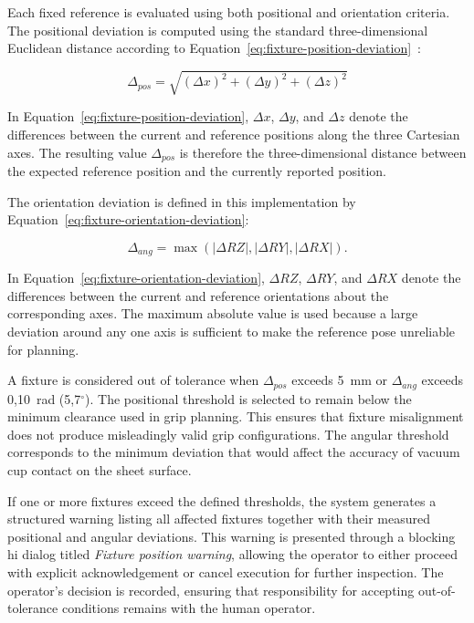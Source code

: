 Each fixed reference is evaluated using both positional and orientation criteria. The positional deviation is computed using the standard three-dimensional Euclidean distance according to Equation~\ref{eq:fixture-position-deviation}~\cite{OpenStaxCalculusVolume3}:

\begin{equation}
\Delta_{pos} = \sqrt{(\Delta x)^2 + (\Delta y)^2 + (\Delta z)^2}
\label{eq:fixture-position-deviation}
\end{equation}

In Equation~\ref{eq:fixture-position-deviation}, $\Delta x$, $\Delta y$, and $\Delta z$ denote the differences between the current and reference positions along the three Cartesian axes. The resulting value $\Delta_{pos}$ is therefore the three-dimensional distance between the expected reference position and the currently reported position.

The orientation deviation is defined in this implementation by Equation~\ref{eq:fixture-orientation-deviation}:

\begin{equation}
\Delta_{ang} = \max\left(|\Delta RZ|, |\Delta RY|, |\Delta RX|\right).
\label{eq:fixture-orientation-deviation}
\end{equation}

In Equation~\ref{eq:fixture-orientation-deviation}, $\Delta RZ$, $\Delta RY$, and $\Delta RX$ denote the differences between the current and reference orientations about the corresponding axes. The maximum absolute value is used because a large deviation around any one axis is sufficient to make the reference pose unreliable for planning.

A fixture is considered out of tolerance when $\Delta_{pos}$ exceeds 5~mm or $\Delta_{ang}$ exceeds 0{,}10~rad (5{,}7$^\circ$). The positional threshold is selected to remain below the minimum clearance used in grip planning. This ensures that fixture misalignment does not produce misleadingly valid grip configurations. The angular threshold corresponds to the minimum deviation that would affect the accuracy of vacuum cup contact on the sheet surface.

If one or more fixtures exceed the defined thresholds, the system generates a structured warning listing all affected fixtures together with their measured positional and angular deviations. This warning is presented through a blocking \ac{hi} dialog titled \textit{Fixture position warning}, allowing the operator to either proceed with explicit acknowledgement or cancel execution for further inspection. The operator's decision is recorded, ensuring that responsibility for accepting out-of-tolerance conditions remains with the human operator.


